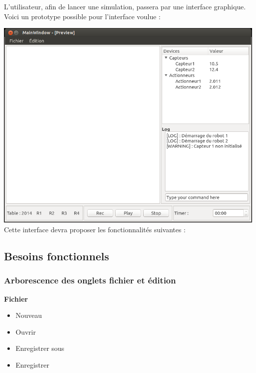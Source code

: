 
L'utilisateur, afin de lancer une simulation, passera par une interface graphique. Voici un prototype possible pour l'interface voulue :



\vspace{5 mm}
\includegraphics[scale=0.5]{GUI.png}
\vspace{5 mm}
\\

Cette interface devra proposer les fonctionnalités suivantes : 

\subsection{Besoins fonctionnels}

\subsubsection{Arborescence des onglets fichier et édition}
\textbf{Fichier}
\begin{itemize}
\item Nouveau
\item Ouvrir
\item Enregistrer sous
\item Enregistrer
\end{itemize}

